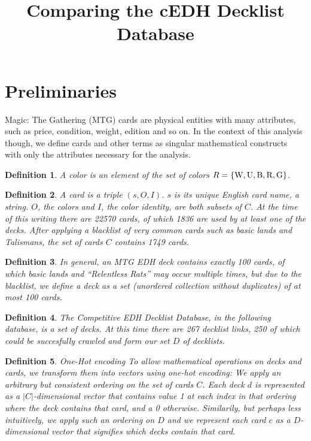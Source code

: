 \documentclass[a4]{article}
\title{Comparing the cEDH Decklist Database}
\newtheorem{definition}{Definition}
\begin{document}
\maketitle
\section{Preliminaries}
Magic: The Gathering (MTG) cards are physical entities with many attributes, such as price, condition, weight, edition and so on.
In the context of this analysis though, we define cards and other terms as singular mathematical constructs with only the attributes necessary for the analysis.

\begin{definition}%
A \emph{color} is an element of the set of \emph{colors} $R = \{\textnormal{W},\textnormal{U},\textnormal{B},\textnormal{R}, \textnormal{G}\}$.
\end{definition}

\begin{definition}%
A \emph{card} is a triple $(s,O,I)$.
$s$ is its unique English card name, a string.
$O$, the colors and $I$, the color identity, are both subsets of $C$.
At the time of this writing there are 22570 cards, of which 1836 are used by at least one of the decks.
After applying a blacklist of very common cards such as basic lands and Talismans, the set of cards $C$ contains 1749 cards.
\end{definition}

\begin{definition}%
In general, an MTG EDH \emph{deck} contains exactly 100 cards, of which basic lands and \enquote{Relentless Rats} may occur multiple times, but due to the blacklist,
 we define a \emph{deck} as a set (unordered collection without duplicates) of at most 100 cards.
\end{definition}

\begin{definition}%
The Competitive EDH Decklist Database, in the following \emph{database}, is a set of decks.
At this time there are 267 decklist links, 250 of which could be succesfully crawled and form our set $D$ of decklists.
\end{definition}

\begin{definition}{One-Hot encoding}
To allow mathematical operations on decks and cards, we transform them into vectors using \emph{one-hot encoding}:
We apply an arbitrary but consistent ordering on the set of cards $C$.
Each deck $d$ is represented as a $|C|$-dimensional vector that contains value 1 at each index in that ordering where the deck contains that card, and a 0 otherwise.
Similarily, but perhaps less intuitively, we apply such an ordering on $D$ and we represent each card $c$ as a $D$-dimensional vector that signifies which decks contain that card.
\end{definition}
\end{document}
